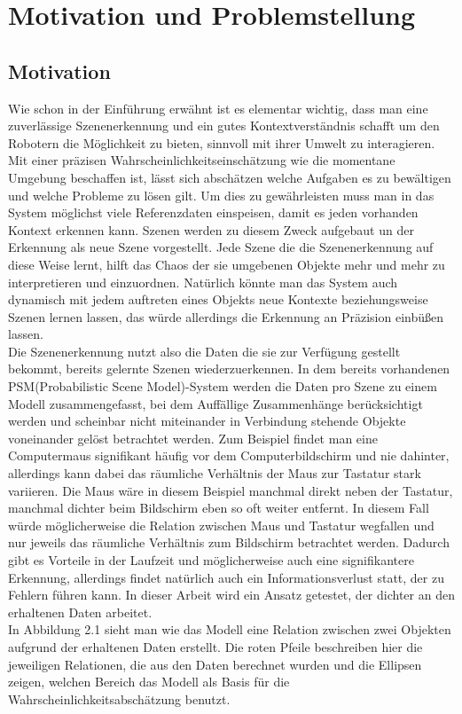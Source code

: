 \chapter{Motivation und Problemstellung}\label{ch:motivation}

\section{Motivation}
Wie schon in der Einführung erwähnt ist es elementar wichtig, dass man eine zuverlässige Szenenerkennung und ein gutes Kontextverständnis schafft um den Robotern die Möglichkeit zu bieten, sinnvoll mit ihrer Umwelt zu interagieren. Mit einer präzisen Wahrscheinlichkeitseinschätzung wie die momentane Umgebung beschaffen ist, lässt sich abschätzen welche Aufgaben es zu bewältigen und welche Probleme zu lösen gilt. Um dies zu gewährleisten muss man in das System möglichst viele Referenzdaten einspeisen, damit es jeden vorhanden Kontext erkennen kann. Szenen werden zu diesem Zweck aufgebaut un der Erkennung als neue Szene vorgestellt. Jede Szene die die Szenenerkennung auf diese Weise lernt, hilft das Chaos der sie umgebenen Objekte mehr und mehr zu interpretieren und einzuordnen. Natürlich könnte man das System auch dynamisch mit jedem auftreten eines Objekts neue Kontexte beziehungsweise Szenen lernen lassen, das würde allerdings die Erkennung an Präzision einbüßen lassen.\smallskip\\
Die Szenenerkennung nutzt also die Daten die sie zur Verfügung gestellt bekommt, bereits gelernte Szenen wiederzuerkennen. In dem bereits vorhandenen PSM(Probabilistic Scene Model)-System werden die Daten pro Szene zu einem Modell zusammengefasst, bei dem Auffällige Zusammenhänge berücksichtigt werden und scheinbar nicht miteinander in Verbindung stehende Objekte voneinander gelöst betrachtet werden. Zum Beispiel findet man eine Computermaus signifikant häufig vor dem Computerbildschirm und nie dahinter, allerdings kann dabei das räumliche Verhältnis der Maus zur Tastatur stark variieren. Die Maus wäre in diesem Beispiel manchmal direkt neben der Tastatur, manchmal dichter beim Bildschirm eben so oft weiter entfernt. In diesem Fall würde möglicherweise die Relation zwischen Maus und Tastatur wegfallen und nur jeweils das räumliche Verhältnis zum Bildschirm betrachtet werden. Dadurch gibt es Vorteile in der Laufzeit und möglicherweise auch eine signifikantere Erkennung, allerdings findet natürlich auch ein Informationsverlust statt, der zu Fehlern führen kann. In dieser Arbeit wird ein Ansatz getestet, der dichter an den erhaltenen Daten arbeitet.\smallskip\\
In Abbildung 2.1 sieht man wie das Modell eine Relation zwischen zwei Objekten aufgrund der erhaltenen Daten erstellt. Die roten Pfeile beschreiben hier die jeweiligen Relationen, die aus den Daten berechnet wurden und die Ellipsen zeigen, welchen Bereich das Modell als Basis für die Wahrscheinlichkeitsabschätzung benutzt.
\begin{deprecated}
\cite{gehrung14}
\end{deprecated}

